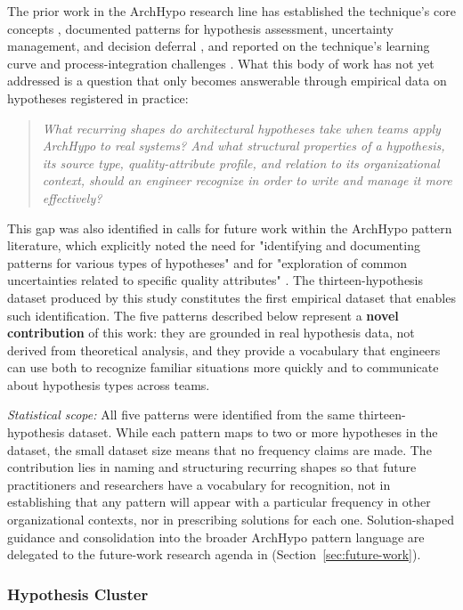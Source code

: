 The prior work in the ArchHypo research line has established the technique's
core concepts \citep{silva2025archhypo}, documented patterns for hypothesis
assessment, uncertainty management, and decision deferral
\citep{silva2024patterns, silva2023initialpatterns}, and reported on the
technique's learning curve and process-integration challenges
\citep{silva2024archhypo}. What this body of work has not yet addressed is
a question that only becomes answerable through empirical data on
hypotheses registered in practice:

\begin{quote}
\textit{What recurring shapes do architectural hypotheses take when teams apply
ArchHypo to real systems? And what structural properties of a hypothesis, its
source type, quality-attribute profile, and relation to its organizational
context, should an engineer recognize in order to write and manage it more
effectively?}
\end{quote}

This gap was also identified in calls for future work within the ArchHypo
pattern literature, which explicitly noted the need for "identifying and
documenting patterns for various types of hypotheses" and for "exploration of
common uncertainties related to specific quality attributes"
\citep{silva2024patterns}. The thirteen-hypothesis dataset produced by this
study constitutes the first empirical dataset that enables such identification.
The five patterns described below represent a \textbf{novel contribution}
of this work: they are grounded in real hypothesis data, not derived
from theoretical analysis, and they provide a vocabulary that 
engineers can use both to recognize familiar situations more quickly and to
communicate about hypothesis types across teams.

\emph{Statistical scope:} All five patterns were identified from the same
thirteen-hypothesis dataset. While each pattern maps to two or more
hypotheses in the dataset, the small dataset size means that no frequency claims are made. 
The contribution lies in naming and structuring recurring shapes so that future practitioners and researchers
have a vocabulary for recognition, not in establishing that any pattern
will appear with a particular frequency in other organizational contexts, nor
in prescribing solutions for each one. Solution-shaped guidance and
consolidation into the broader ArchHypo pattern language are delegated to the
future-work research agenda in (Section~\ref{sec:future-work}).

\subsubsection{Hypothesis Cluster}
\label{subsubsec:pattern-b1}

